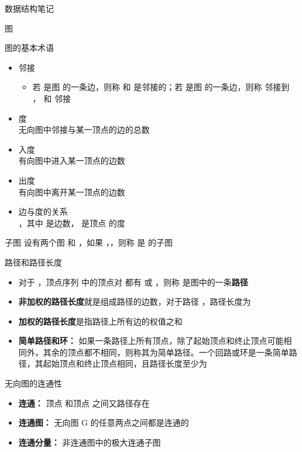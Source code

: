 \documentclass[
  ignorenonframetext,
]{beamer}
\providecommand{\tightlist}{%
  \setlength{\itemsep}{0pt}\setlength{\parskip}{0pt}}
\begin{document}
\begin{frame}[fragile]{数据结构笔记}
\begin{block}{图}
\begin{block}{图的基本术语}
\protect{}\label{ux56feux7684ux57faux672cux672fux8bed}
\begin{itemize}
\tightlist
\item
  邻接

  \begin{itemize}
  \tightlist
  \item
    若 {} 是图 {} 的一条边，则称 {} 和 {} 是邻接的；若 {} 是图 {}
    的一条边，则称 {} 邻接到 {}，{} 和 {} 邻接
  \end{itemize}
\item
  度\\
  无向图中邻接与某一顶点的边的总数
\item
  入度\\
  有向图中进入某一顶点的边数
\item
  出度\\
  有向图中离开某一顶点的边数
\item
  边与度的关系\\
  {}，其中 {} 是边数，{} 是顶点 {} 的度
\end{itemize}

\begin{block}{子图}
\protect{}\label{ux5b50ux56fe}
设有两个图 {} 和 {}，如果 {}，{}，则称 {} 是 {} 的子图
\end{block}

\begin{block}{路径和路径长度}
\protect{}\label{ux8defux5f84ux548cux8defux5f84ux957fux5ea6}
\begin{itemize}
\tightlist
\item
  对于 {}，顶点序列 {} 中的顶点对 {} 都有 {} 或 {}，则称 {}
  是图中的一条\textbf{路径}
\item
  \textbf{非加权的路径长度}就是组成路径的边数，对于路径 {}，路径长度为
  {}
\item
  \textbf{加权的路径长度}是指路径上所有边的权值之和
\item
  \textbf{简单路径和环：}
  如果一条路径上所有顶点，除了起始顶点和终止顶点可能相同外，其余的顶点都不相同，则称其为简单路径。一个回路或环是一条简单路径，其起始顶点和终止顶点相同，且路径长度至少为
  {}
\end{itemize}
\end{block}

\begin{block}{无向图的连通性}
\protect{}\label{ux65e0ux5411ux56feux7684ux8fdeux901aux6027}
\begin{itemize}
\tightlist
\item
  \textbf{连通：} 顶点 {} 和顶点 {} 之间又路径存在
\item
  \textbf{连通图：} 无向图 G 的任意两点之间都是连通的
\item
  \textbf{连通分量：} 非连通图中的极大连通子图
\end{itemize}
\end{block}


\end{block}
\end{block}
\end{frame}
\end{document}
